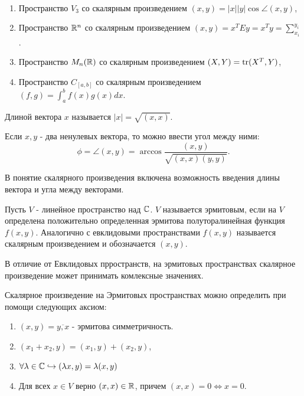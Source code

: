 \begin{example}~
    \begin{enumerate}
        \item Пространство $V_3$ со скалярным произведением $(x, y) = |x| |y| \cos\angle (x, y)$,
        \item Пространство $\mathbb{R}^n$ со скалярным произведением $(x, y) = x^T E y = x^T y = \displaystyle\sum_{x_i}^{y_i}$.
        \item Пространство $M_n(\mathbb{R})$ со скалярным произведением $(X, Y) = \operatorname{tr}(X^T, Y)$,
        \item Пространство $C_{[a, b]}$ со скалярным произведением $ (f, g) = \int_{a}^{b} f(x)g(x) dx$.
    \end{enumerate} 
\end{example}

\begin{definition}
    Длиной вектора $x$ называется $|x| = \sqrt{(x,x)}$.
\end{definition}

\begin{definition}
    Если $x, y$ - два ненулевых вектора, то можно ввести угол между ними: 
    $$\phi = \angle (x, y) = \arccos \frac{(x, y)}{\sqrt{(x, x)(y, y)}}.$$
\end{definition}

\begin{note}
    В понятие скалярного произведения включена возможность введения длины вектора и угла между 
    векторами.
\end{note}

\begin{definition}
    Пусть $V$ - линейное пространство над $\mathbb{C}$. $V$ называется эрмитовым, если на $V$ определена 
    положительно определенная эрмитова полуторалинейная функция $f(x, y)$. Аналогично с евклидовыми 
    пространствами $f(x, y)$ называется скалярным произведением и обозначается $(x, y)$.
\end{definition}

\begin{note}
    В отличие от Евклидовых прространств, на эрмитовых пространствах скалярное произведение может 
    принимать комлексные значениях.
\end{note}

\begin{note}
    Скалярное произведение на Эрмитовых пространствах можно определить при помощи следующих аксиом:
    \begin{enumerate}
        \item $(x, y) = \overline{y, x}$ - эрмитова симметричность.
        \item $(x_1 + x_2, y) = (x_1, y) + (x_2, y)$, 
        \item $\forall \lambda \in \mathbb{C} \hookrightarrow (\lambda x, y) = \lambda(x, y)$
        \item Для всех $x \in V$ верно $(x, x) \in \mathbb{R}$, причем $(x, x) = 0 \Leftrightarrow x = 0$.
    \end{enumerate}
\end{note}

